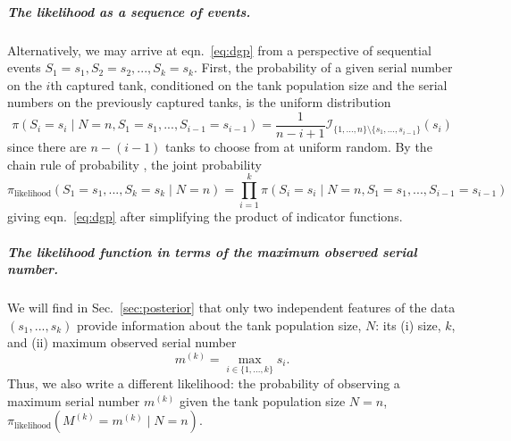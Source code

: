 \documentclass[11pt, oneside]{article}
\newcommand{\data}{$(s_1, ..., s_k)$\xspace}
\begin{document}
\subparagraph{The likelihood as a sequence of events.} 
Alternatively, we may arrive at eqn.~\ref{eq:dgp} from a perspective of sequential events $S_1=s_1, S_2=s_2, ..., S_k=s_k$. First, the probability of a given serial number on the $i$th captured tank, conditioned on the tank population size and the serial numbers on the previously captured tanks, is the uniform distribution
\begin{equation}
	\pi (S_i=s_i \mid N=n, S_1=s_1, ..., S_{i-1}=s_{i-1})=\dfrac{1}{n-i+1} \mathcal{I}_{ \{1,...,n\} \setminus \{s_1, ..., s_{i-1}\}}(s_i)
\end{equation}
since there are $n-(i-1)$ tanks to choose from at uniform random.
By the chain rule of probability \cite{koch2007introduction}, the joint probability
\begin{equation}
	\pi_{\text{likelihood}}(S_1=s_1, ..., S_k=s_k \mid N=n) = \displaystyle \prod_{i=1}^k \pi (S_i=s_i \mid N=n, S_1=s_1,...,S_{i-1}=s_{i-1})
\end{equation}
giving eqn.~\ref{eq:dgp} after simplifying the product of indicator functions.

\subparagraph{The likelihood function in terms of the maximum observed serial number.}
We will find in Sec.~\ref{sec:posterior} that only two independent features of the data \data provide information about the tank population size, $N$: its (i) size, $k$, and (ii) maximum observed serial number 
\begin{equation}
    m^{(k)} = \max_{i \in \{1, ..., k\}} s_i .
\end{equation} 
Thus, we also write a different likelihood: the probability of observing a maximum serial number $m^{(k)}$ given the tank population size $N=n$,  $\pi_{\text{likelihood}}(M^{(k)}=m^{(k)} \mid N=n)$.
\end{document}
